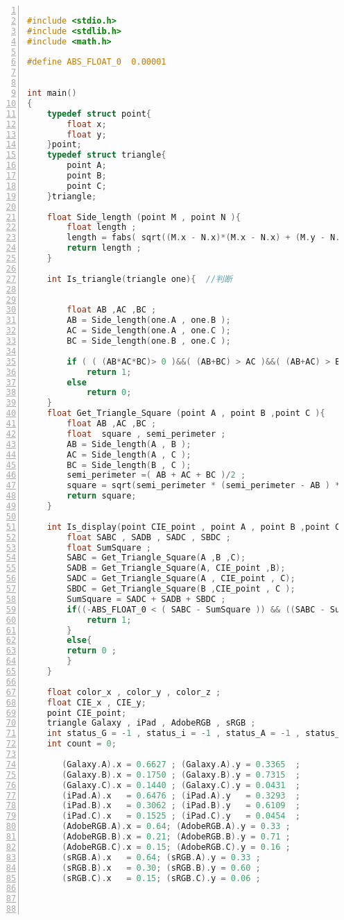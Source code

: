 \documentclass[UTF8]{article}
\begin{document}
\begin{lstlisting}[language=C, label=lst:Sources, caption=Sources, numbers=left, stepnumber=1, frame=leftline , texcl=true, basicstyle=\ttfamily]

#include <stdio.h>
#include <stdlib.h>
#include <math.h>

#define ABS_FLOAT_0  0.00001


int main()
{
    typedef struct point{
        float x;
        float y;
    }point;
    typedef struct triangle{
        point A;
        point B;
        point C;
    }triangle;

    float Side_length (point M , point N ){
        float length ;
        length = fabs( sqrt((M.x - N.x)*(M.x - N.x) + (M.y - N.y)*(M.y - N.y)) );
        return length ;
    }

    int Is_triangle(triangle one){  //判断


        float AB ,AC ,BC ;
        AB = Side_length(one.A , one.B );
        AC = Side_length(one.A , one.C );
        BC = Side_length(one.B , one.C );

        if ( ( (AB*AC*BC)> 0 )&&( (AB+BC) > AC )&&( (AB+AC) > BC ) &&( (AC+BC) > AB )  )
            return 1;
        else
            return 0;
    }
    float Get_Triangle_Square (point A , point B ,point C ){
        float AB ,AC ,BC ;
        float  square , semi_perimeter ;
        AB = Side_length(A , B );
        AC = Side_length(A , C );
        BC = Side_length(B , C );
        semi_perimeter =( AB + AC + BC )/2 ;
        square = sqrt(semi_perimeter * (semi_perimeter - AB ) * (semi_perimeter - BC ) * (semi_perimeter - AC ) );
        return square;
    }

    int Is_display(point CIE_point , point A , point B ,point C){
        float SABC , SADB , SADC , SBDC ;
        float SumSquare ;
        SABC = Get_Triangle_Square(A ,B ,C);
        SADB = Get_Triangle_Square(A, CIE_point ,B);
        SADC = Get_Triangle_Square(A , CIE_point , C);
        SBDC = Get_Triangle_Square(B ,CIE_point , C );
        SumSquare = SADC + SADB + SBDC ;
        if((-ABS_FLOAT_0 < ( SABC - SumSquare )) && ((SABC - SumSquare) < ABS_FLOAT_0   )){
            return 1;
        }
        else{
        return 0 ;
        }
    }

    float color_x , color_y , color_z ;
    float CIE_x , CIE_y;
    point CIE_point;
    triangle Galaxy , iPad , AdobeRGB , sRGB ;
    int status_G = -1 , status_i = -1 , status_A = -1 , status_s = -1 ;
    int count = 0;

       (Galaxy.A).x = 0.6627 ; (Galaxy.A).y = 0.3365  ;
       (Galaxy.B).x = 0.1750 ; (Galaxy.B).y = 0.7315  ;
       (Galaxy.C).x = 0.1440 ; (Galaxy.C).y = 0.0431  ;
       (iPad.A).x   = 0.6476 ; (iPad.A).y   = 0.3293  ;
       (iPad.B).x   = 0.3062 ; (iPad.B).y   = 0.6109  ;
       (iPad.C).x   = 0.1525 ; (iPad.C).y   = 0.0454  ;
       (AdobeRGB.A).x = 0.64; (AdobeRGB.A).y = 0.33 ;
       (AdobeRGB.B).x = 0.21; (AdobeRGB.B).y = 0.71 ;
       (AdobeRGB.C).x = 0.15; (AdobeRGB.C).y = 0.16 ;
       (sRGB.A).x   = 0.64; (sRGB.A).y = 0.33 ;
       (sRGB.B).x   = 0.30; (sRGB.B).y = 0.60 ;
       (sRGB.C).x   = 0.15; (sRGB.C).y = 0.06 ;




\end{lstlisting}
\end{document}
